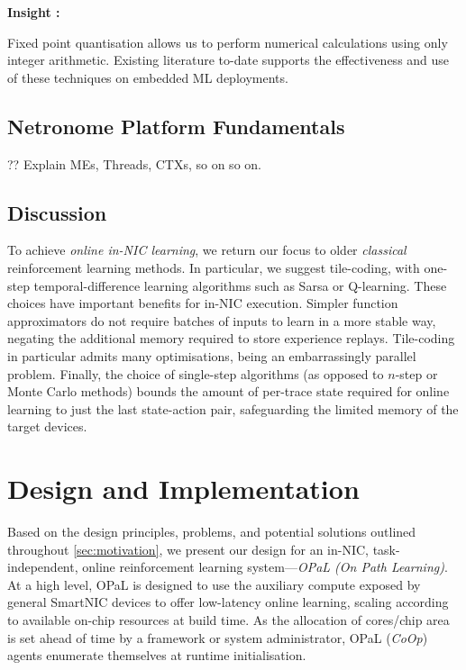 \documentclass[sigconf,natbib=false]{acmart}
\newcommand{\approach}{On Path Learning}
\newcommand{\approachshort}{OPaL}
\newcommand{\Coopfw}{\emph{CoOp}}
\newcounter{insightc}
\newenvironment{insight}
	{
		\begin{tipblock}\refstepcounter{insightc}\textbf{Insight \theinsightc:}\em
	}
	{
		\end{tipblock}
	}
\begin{document}
\begin{insight}
	Fixed point quantisation allows us to perform numerical calculations using only integer arithmetic.
	Existing literature to-date supports the effectiveness and use of these techniques on embedded ML deployments.
\end{insight}

\subsection{Netronome Platform Fundamentals}
?? Explain MEs, Threads, CTXs, so on so on.

\subsection{Discussion}

To achieve \emph{online in-NIC learning}, we return our focus to older \emph{classical} reinforcement learning methods.
In particular, we suggest tile-coding, with one-step temporal-difference learning algorithms such as Sarsa or Q-learning.
These choices have important benefits for in-NIC execution.
Simpler function approximators do not require batches of inputs to learn in a more stable way, negating the additional memory required to store experience replays.
Tile-coding in particular admits many optimisations, being an embarrassingly parallel problem.
Finally, the choice of single-step algorithms (as opposed to $n$-step or Monte Carlo methods) bounds the amount of per-trace state required for online learning to just the last state-action pair, safeguarding the limited memory of the target devices.

\section{Design and Implementation}\label{sec:design}
Based on the design principles, problems, and potential solutions outlined throughout \cref{sec:motivation}, we present our design for an in-NIC, task-independent, online reinforcement learning system---\emph{\approachshort{} (\approach)}.
At a high level, \approachshort{} is designed to use the auxiliary compute exposed by general SmartNIC devices to offer low-latency online learning, scaling according to available on-chip resources at build time.
As the allocation of cores/chip area is set ahead of time by a framework or system administrator, \approachshort{} (\Coopfw) agents enumerate themselves at runtime initialisation.
\end{document}
